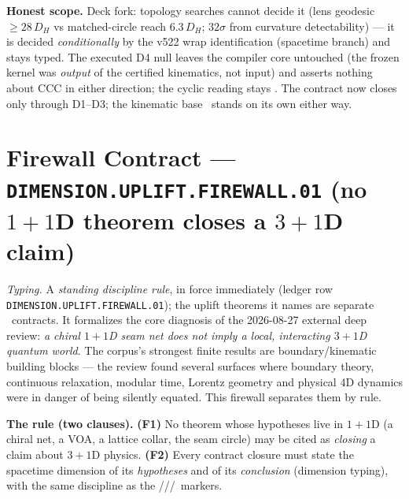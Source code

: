 \documentclass[11pt,a4paper]{article}
\begin{document}
\par\smallskip\noindent\textbf{Honest scope.}  Deck fork: topology searches cannot decide it
(lens geodesic $\ge28\,D_H$ vs matched-circle reach $6.3\,D_H$; $32\sigma$ from curvature
detectability) --- it is decided \emph{conditionally} by the v522 wrap identification (spacetime
branch) and stays typed.  The executed D4 null leaves the compiler core untouched (the frozen
kernel was \emph{output} of the certified kinematics, not input) and asserts nothing about CCC
in either direction; the cyclic reading stays \mC.  The contract now closes only through
D1--D3; the kinematic base \mE\ stands on its own either way.

\section*{Firewall Contract --- \texttt{DIMENSION.UPLIFT.FIREWALL.01} (no $1{+}1$D theorem closes a $3{+}1$D claim)}
\noindent\emph{Typing.} A \emph{standing discipline rule}, in force immediately (ledger row
\texttt{DIMENSION.UPLIFT.FIREWALL.01}); the uplift theorems it names are separate \mO\ contracts.
It formalizes the core diagnosis of the 2026-08-27 external deep review: \emph{a chiral $1{+}1$D
seam net does not imply a local, interacting $3{+}1$D quantum world}.  The corpus's strongest
finite results are boundary/kinematic building blocks --- the review found several surfaces where
boundary theory, continuous relaxation, modular time, Lorentz geometry and physical 4D dynamics
were in danger of being silently equated.  This firewall separates them by rule.

\par\smallskip\noindent\textbf{The rule (two clauses).}
\textbf{(F1)} No theorem whose hypotheses live in $1{+}1$D (a chiral net, a VOA, a lattice
collar, the seam circle) may be cited as \emph{closing} a claim about $3{+}1$D physics.
\textbf{(F2)} Every contract closure must state the spacetime dimension of its \emph{hypotheses}
and of its \emph{conclusion} (dimension typing), with the same discipline as the
\mE/\mC/\mO/\mX\ markers.
\end{document}
